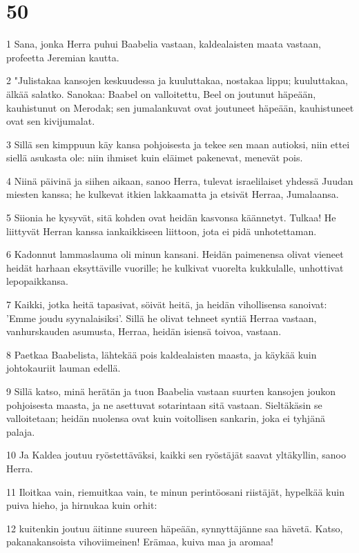 \chapter{50}

\par 1 Sana, jonka Herra puhui Baabelia vastaan, kaldealaisten maata vastaan, profeetta Jeremian kautta.
\par 2 "Julistakaa kansojen keskuudessa ja kuuluttakaa, nostakaa lippu; kuuluttakaa, älkää salatko. Sanokaa: Baabel on valloitettu, Beel on joutunut häpeään, kauhistunut on Merodak; sen jumalankuvat ovat joutuneet häpeään, kauhistuneet ovat sen kivijumalat.
\par 3 Sillä sen kimppuun käy kansa pohjoisesta ja tekee sen maan autioksi, niin ettei siellä asukasta ole: niin ihmiset kuin eläimet pakenevat, menevät pois.
\par 4 Niinä päivinä ja siihen aikaan, sanoo Herra, tulevat israelilaiset yhdessä Juudan miesten kanssa; he kulkevat itkien lakkaamatta ja etsivät Herraa, Jumalaansa.
\par 5 Siionia he kysyvät, sitä kohden ovat heidän kasvonsa käännetyt. Tulkaa! He liittyvät Herran kanssa iankaikkiseen liittoon, jota ei pidä unhotettaman.
\par 6 Kadonnut lammaslauma oli minun kansani. Heidän paimenensa olivat vieneet heidät harhaan eksyttäville vuorille; he kulkivat vuorelta kukkulalle, unhottivat lepopaikkansa.
\par 7 Kaikki, jotka heitä tapasivat, söivät heitä, ja heidän vihollisensa sanoivat: 'Emme joudu syynalaisiksi'. Sillä he olivat tehneet syntiä Herraa vastaan, vanhurskauden asumusta, Herraa, heidän isiensä toivoa, vastaan.
\par 8 Paetkaa Baabelista, lähtekää pois kaldealaisten maasta, ja käykää kuin johtokauriit lauman edellä.
\par 9 Sillä katso, minä herätän ja tuon Baabelia vastaan suurten kansojen joukon pohjoisesta maasta, ja ne asettuvat sotarintaan sitä vastaan. Sieltäkäsin se valloitetaan; heidän nuolensa ovat kuin voitollisen sankarin, joka ei tyhjänä palaja.
\par 10 Ja Kaldea joutuu ryöstettäväksi, kaikki sen ryöstäjät saavat yltäkyllin, sanoo Herra.
\par 11 Iloitkaa vain, riemuitkaa vain, te minun perintöosani riistäjät, hypelkää kuin puiva hieho, ja hirnukaa kuin orhit:
\par 12 kuitenkin joutuu äitinne suureen häpeään, synnyttäjänne saa hävetä. Katso, pakanakansoista vihoviimeinen! Erämaa, kuiva maa ja aromaa!
